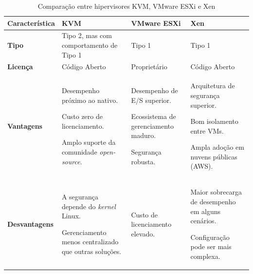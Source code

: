 \begin{table}[H]
    \centering
    \renewcommand{\arraystretch}{1.3}
    \caption{Comparação entre hipervisores KVM, VMware ESXi e Xen}
    \label{tab:hipervisores}
    \begin{tabularx}{\textwidth}{| >{\raggedright\arraybackslash}p{3cm} | X | X | X |}
        \hline
        \textbf{Característica} & \textbf{KVM} & \textbf{VMware ESXi} & \textbf{Xen} \\ \hline
        \textbf{Tipo} & Tipo 2, mas com comportamento de Tipo 1 & Tipo 1 & Tipo 1 \\ \hline
        \textbf{Licença} & Código Aberto & Proprietário & Código Aberto \\ \hline
        \textbf{Vantagens} &
        \begin{description}
            \item Desempenho próximo ao nativo.
            \item Custo zero de licenciamento.
            \item Amplo suporte da comunidade \textit{open-source}.
        \end{description} &
        \begin{description}
            \item Desempenho de E/S superior.
            \item Ecossistema de gerenciamento maduro.
            \item Segurança robusta.
        \end{description} &
        \begin{description}
            \item Arquitetura de segurança superior.
            \item Bom isolamento entre VMs.
            \item Ampla adoção em nuvens públicas (AWS).
        \end{description} \\ \hline
        \textbf{Desvantagens} &
        \begin{description}
            \item A segurança depende do \textit{kernel} Linux.
            \item Gerenciamento menos centralizado que outras soluções.
        \end{description} &
        \begin{description}
            \item Custo de licenciamento elevado.
        \end{description} &
        \begin{description}
            \item Maior sobrecarga de desempenho em alguns cenários.
            \item Configuração pode ser mais complexa.
        \end{description} \\ \hline
    \end{tabularx}
\end{table}

